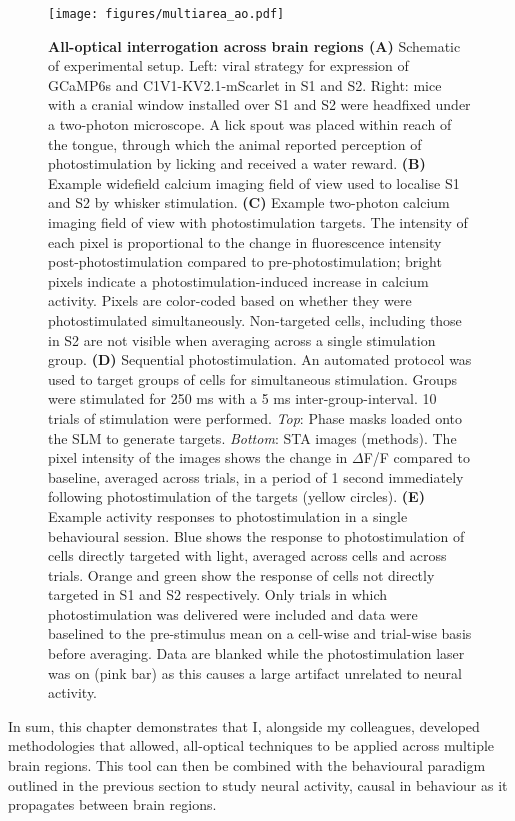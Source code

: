 \begin{figure}[h]
\texttt{[image: figures/multiarea\_ao.pdf]}
\caption[\textbf{All-optical interrogation across brain regions}]{
\textbf{All-optical interrogation across brain regions (A)} Schematic of experimental setup. Left: viral strategy for expression of GCaMP6s and C1V1-KV2.1-mScarlet in S1 and S2.  Right: mice with a cranial window installed over S1 and S2 were headfixed under a two-photon microscope. A lick spout was placed within reach of the tongue, through which the animal reported perception of photostimulation by licking and received a water reward. \textbf{(B)} Example widefield calcium imaging field of view used to localise S1 and S2 by whisker stimulation. \textbf{(C)} Example two-photon calcium imaging field of view with photostimulation targets. The intensity of each pixel is proportional to the change in fluorescence intensity post-photostimulation compared to pre-photostimulation; bright pixels indicate a photostimulation-induced increase in calcium activity. Pixels are color-coded based on whether they were photostimulated simultaneously. Non-targeted cells, including those in S2 are not visible when averaging across a single stimulation group.
\textbf{(D)} Sequential photostimulation. An
automated protocol was used to target groups of cells for simultaneous stimulation. Groups
were stimulated for 250 ms with a 5 ms inter-group-interval. 10 trials of stimulation were
performed. \textit{Top}: Phase masks loaded onto the SLM to generate targets. \textit{Bottom}: STA images (methods). The pixel intensity of the images shows the change in $\Delta$F/F compared to baseline, averaged across trials, in a period of 1 second immediately following photostimulation of the targets (yellow circles). \textbf{(E)} Example activity responses to photostimulation in a single behavioural session. Blue shows the response to photostimulation of cells directly targeted with light, averaged across cells and across trials. Orange and green show the response of cells not directly targeted in S1 and S2 respectively. Only trials in which photostimulation was delivered were included and data were baselined to the pre-stimulus mean on a cell-wise and trial-wise basis before averaging. Data are blanked while the photostimulation laser was on (pink bar) as this causes a large artifact unrelated to neural activity.
} 
\label{fig:s1s2}
\end{figure}

In sum, this chapter demonstrates that I, alongside my colleagues, developed methodologies that allowed, all-optical techniques to be applied across multiple brain regions. This tool can then be combined with the behavioural paradigm outlined in the previous section to study neural activity, causal in behaviour as it propagates between brain regions.
